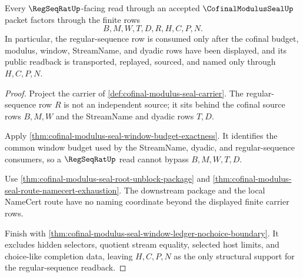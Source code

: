 \begin{theorem}
\label{thm:cofinal-modulus-seal-regseqrat-route-exhaustion}
Every $\RegSeqRatUp$-facing read through an accepted $\CofinalModulusSealUp$ packet factors through the finite rows
$$
B,M,W,T,D,R,H,C,P,N.
$$
In particular, the regular-sequence row is consumed only after the cofinal budget, modulus, window, StreamName, and dyadic rows have been displayed, and its public readback is transported, replayed, sourced, and named only through $H,C,P,N$.
\end{theorem}
\begin{proof}
Project the carrier of \autoref{def:cofinal-modulus-seal-carrier}. The regular-sequence row $R$ is not an independent source; it sits behind the cofinal source rows $B,M,W$ and the StreamName and dyadic rows $T,D$.

Apply \autoref{thm:cofinal-modulus-seal-window-budget-exactness}. It identifies the common window budget used by the StreamName, dyadic, and regular-sequence consumers, so a $\RegSeqRatUp$ read cannot bypass $B,M,W,T,D$.

Use \autoref{thm:cofinal-modulus-seal-root-unblock-package} and \autoref{thm:cofinal-modulus-seal-route-namecert-exhaustion}. The downstream package and the local NameCert route have no naming coordinate beyond the displayed finite carrier rows.

Finish with \autoref{thm:cofinal-modulus-seal-window-ledger-nochoice-boundary}. It excludes hidden selectors, quotient stream equality, selected host limits, and choice-like completion data, leaving $H,C,P,N$ as the only structural support for the regular-sequence readback.
\end{proof}

